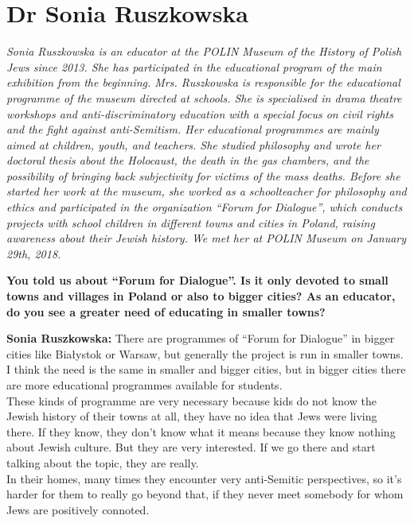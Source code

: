 \section{Dr Sonia Ruszkowska}

\textit{Sonia Ruszkowska is an educator at the POLIN Museum of the History of Polish Jews since 2013. She has participated in the educational program of the main exhibition from the beginning. Mrs. Ruszkowska is responsible for the educational programme of the museum directed at schools. She is specialised in drama theatre workshops and anti-discriminatory education with a special focus on civil rights and the fight against anti-Semitism. Her educational programmes are mainly aimed at children, youth, and teachers. She studied philosophy and wrote her doctoral thesis about the Holocaust, the death in the gas chambers, and the possibility of bringing back subjectivity for victims of the mass deaths. Before she started her work at the museum, she worked as a schoolteacher for philosophy and ethics and participated in the organization ``Forum for Dialogue'', which conducts projects with school children in different towns and cities in Poland, raising awareness about their Jewish history. We met her at POLIN Museum on January 29th, 2018.}\par  
\vspace*{2em}
\textbf{You told us about ``Forum for Dialogue''. Is it only devoted to small towns and villages in Poland or also to bigger cities? As an educator, do you see a greater need of educating in smaller towns?} 

\textbf{Sonia Ruszkowska:} There are programmes of ``Forum for Dialogue'' in bigger cities like Białystok or Warsaw, but generally the project is run in smaller towns. I think the need is the same in smaller and bigger cities, but in bigger cities there are more educational programmes available for students.\\
These kinds of programme are very necessary because kids do not know the Jewish history of their towns at all, they have no idea that Jews were living there. If they know, they don't know what it means because they know nothing about Jewish culture. But they are very interested. If we go there and start talking about the topic, they are really.\\
In their homes, many times they encounter very anti-Semitic perspectives, so it’s harder for them to really go beyond that, if they never meet somebody for whom Jews are positively connoted. 

